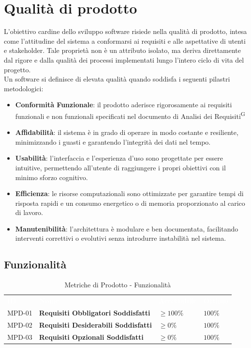 \documentclass[a4paper, 11pt]{article}
\begin{document}
\section{Qualità di prodotto}
L'obiettivo cardine dello sviluppo software risiede nella qualità di prodotto, intesa come l'attitudine del sistema a conformarsi ai requisiti e alle aspettative di utenti e stakeholder. Tale proprietà non è un attributo isolato, ma deriva direttamente dal rigore e dalla qualità dei processi implementati lungo l'intero ciclo di vita del progetto.
\\
Un software si definisce di elevata qualità quando soddisfa i seguenti pilastri metodologici:
\begin{itemize}
    \item \textbf{Conformità Funzionale}: il prodotto aderisce rigorosamente ai requisiti funzionali e non funzionali specificati nel documento di Analisi dei Requisiti\textsuperscript{G} 
    \item \textbf{Affidabilità}: il sistema è in grado di operare in modo costante e resiliente, minimizzando i guasti e garantendo l'integrità dei dati nel tempo.
    \item \textbf{Usabilità}: l'interfaccia e l'esperienza d'uso sono progettate per essere intuitive, permettendo all'utente di raggiungere i propri obiettivi con il minimo sforzo cognitivo.
    \item \textbf{Efficienza}: le risorse computazionali sono ottimizzate per garantire tempi di risposta rapidi e un consumo energetico o di memoria proporzionato al carico di lavoro.
    \item \textbf{Manutenibilità}: l'architettura è modulare e ben documentata, facilitando interventi correttivi o evolutivi senza introdurre instabilità nel sistema.
\end{itemize}

\subsection{Funzionalità}
\begin{table}[h!]
    \centering
    \begin{tabular}{>{\centering\arraybackslash}m{1.5cm} p{6cm} >{\centering\arraybackslash}m{3cm} >{\centering\arraybackslash}m{2.5cm}}
        \rowcolor{AccentColor}
        \textcolor{white}{\textbf{ID}} & \textcolor{white}{\textbf{Nome}} & \textcolor{white}{\textbf{Accettabile}} & \textcolor{white}{\textbf{Ottimo}} \\
        MPD-01 & \textbf{Requisiti Obbligatori Soddisfatti} & $\geq 100\%$ & $100\%$ \\
        MPD-02 & \textbf{Requisiti Desiderabili Soddisfatti} & $\geq 0\%$ & $100\%$ \\
        MPD-03 & \textbf{Requisiti Opzionali Soddisfatti} & $\geq 0\%$ & $100\%$ \\
    \end{tabular}
    \caption{Metriche di Prodotto - Funzionalità}
\end{table}
\end{document}
